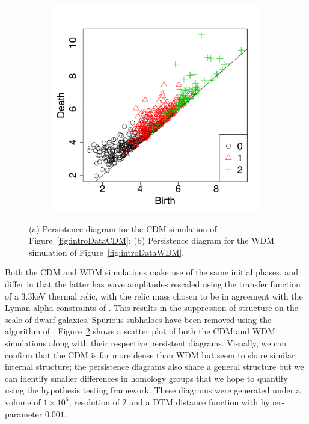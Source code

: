 \documentclass[12pt]{article}
\newcommand{\figref}[1]{Figure~\ref{#1}}
\begin{document}
\begin{figure}[htp!]
\begin{subfigure}{0.45\textwidth}
    \includegraphics[width=\linewidth]{figure_11_wdm_pd.pdf}
    \label{fig:eagleDiagsD}
  \end{subfigure}
  \caption{(a) Persistence diagram for the CDM simulation of Figure~\ref{fig:introDataCDM}; (b) Persistence diagram for the WDM simulation of Figure~\ref{fig:introDataWDM}.}
  \label{fig:eagleDiags}
\end{figure}

Both the CDM and WDM simulations make use of the same initial phases, and differ in that the latter has wave amplitudes rescaled using the transfer function of a 3.3keV thermal relic, with the relic mass chosen to be in agreement with the Lyman-alpha constraints of \citep{viel2013warm}. This results in the suppression of structure on the scale of dwarf galaxies. Spurious subhaloes have been removed using the algorithm of \citep{lovell2014properties}. \figref{fig:eagleDiags} shows a scatter plot of both the CDM and WDM simulations along with their respective persistent diagrams. Visually, we can confirm that the CDM is far more dense than WDM but seem to share similar internal structure; the persistence diagrams also share a general structure but we can identify smaller differences in homology groups that we hope to quantify using the hypothesis testing framework. These diagrams were generated under a volume of $1\times 10^{6}$, resolution of $2$ and a DTM distance function with hyper-parameter $0.001$.
\end{document}
